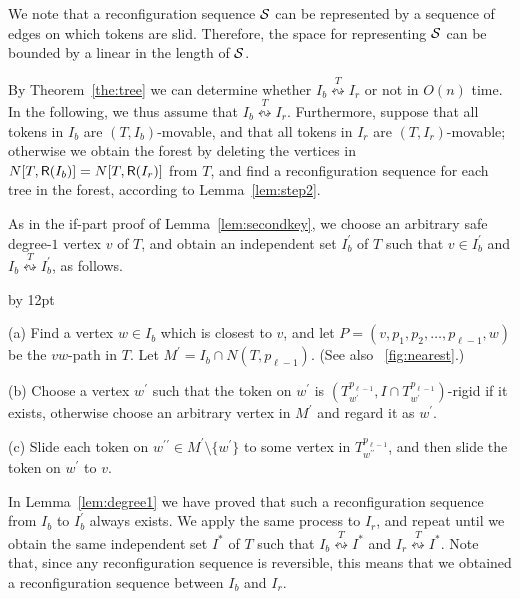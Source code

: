 \documentclass{llncs}
\newcommand{\Nei}[2]{N(#1,#2)}
\newcommand{\Neiclosed}[2]{N[#1, #2]}
\newcommand{\Tsub}[2]{T_{#1}^{#2}}
\newcommand{\bfI}{I}
\newcommand{\calS}{{\cal S}}
\newcommand{\sevstep}{\leftrightsquigarrow}
\newcommand{\sevstepT}[1]{\overset{#1}{\sevstep}}
\newcommand{\ImSet}[1]{{\sf R}(\bfI_{#1})}
\newcommand{\bfIstar}{\bfI^*}
\newcommand{\bfIp}{\bfI^{\prime}}
\newenvironment{listing}[1]{\begin{list}{*}{\settowidth{\labelwidth}{#1}\setlength{\leftmargin}{\labelwidth}\advance \leftmargin by 12pt
\setlength{\itemsep}{0pt}\setlength{\parsep}{0pt}\setlength{\topsep}{0pt}\setlength{\parskip}{0pt}}}{\end{list}}
\begin{document}
	We note that a reconfiguration sequence $\calS$ can be represented by a sequence of edges on which tokens are slid. 
	Therefore, the space for representing $\calS$ can be bounded by a linear in the length of $\calS$. 
	
	By Theorem~\ref{the:tree} we can determine whether $\bfI_b \sevstepT{T} \bfI_r$ or not in $O(n)$ time. 
	In the following, we thus assume that $\bfI_b \sevstepT{T} \bfI_r$. 
	Furthermore, suppose that all tokens in $\bfI_b$ are $(T, \bfI_b)$-movable, and that all tokens in $\bfI_r$ are $(T, \bfI_r)$-movable;
otherwise we obtain the forest by deleting the vertices in $\Neiclosed{T}{\ImSet{b}} = \Neiclosed{T}{\ImSet{r}}$ from $T$, and find a reconfiguration sequence for each tree in the forest, according to Lemma~\ref{lem:step2}. 

	As in the if-part proof of Lemma~\ref{lem:secondkey}, we choose an arbitrary safe degree-$1$ vertex $v$ of $T$, and obtain an independent set $\bfIp_b$ of $T$ such that $v \in \bfIp_b$ and $\bfI_b \sevstepT{T} \bfIp_b$, as follows.
	\begin{listing}{aaa}
	\item[(a)] Find a vertex $w \in \bfI_b$ which is closest to $v$, and let $P = (v, p_{1}, p_{2}, \ldots, p_{\ell-1}, w)$ be the $vw$-path in $T$.
					Let $M^\prime = \bfI_b \cap \Nei{T}{p_{\ell-1}}$.
					(See also \figurename~\ref{fig:nearest}.)
	\item[(b)] Choose a vertex $w^\prime$ such that the token on $w^\prime$ is $(\Tsub{w^\prime}{p_{\ell-1}}, \bfI \cap \Tsub{w^\prime}{p_{\ell-1}})$-rigid if it exists, otherwise choose an arbitrary vertex in $M^\prime$ and regard it as $w^\prime$. 
	\item[(c)] Slide each token on $w^{\prime \prime} \in M^\prime \setminus \{w^\prime\}$ to some vertex in $\Tsub{w^{\prime \prime}}{p_{\ell-1}}$, and then slide the token on $w^\prime$ to $v$.
	\end{listing}
	In Lemma~\ref{lem:degree1} we have proved that such a reconfiguration sequence from $\bfI_b$ to $\bfIp_b$ always exists. 
	We apply the same process to $\bfI_r$, and repeat until we obtain the same independent set $\bfIstar$ of $T$ such that $\bfI_b \sevstepT{T} \bfIstar$ and $\bfI_r \sevstepT{T} \bfIstar$. 
	Note that, since any reconfiguration sequence is reversible, this means that we obtained a reconfiguration sequence between $\bfI_b$ and $\bfI_r$. 
	
\end{document}
